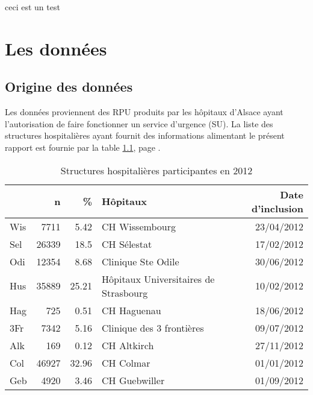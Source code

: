 \documentclass[12pt,english,french]{report}
\begin{document}








ceci est un test
%
%

\chapter{Les données}

\section{Origine des données}

Les données proviennent des RPU produits par les hôpitaux d'Alsace ayant l'autorisation de faire fonctionner un service d'urgence (SU). La liste des structures hospitalières ayant fournit des informations alimentant le présent rapport est fournie par la table \ref{tab1}, page \pageref{tab1}.

\begin{table}[ht]
\begin{center}
\begin{tabular}{|l|r|r|l|r|}
  \hline
 & n & \% & Hôpitaux & Date d'inclusion \\ 
  \hline
Wis & 7711 & 5.42 & CH Wissembourg & 23/04/2012 \\ 
  Sel & 26339 & 18.5 & CH Sélestat & 17/02/2012 \\ 
  Odi & 12354 & 8.68 & Clinique Ste Odile & 30/06/2012 \\ 
  Hus & 35889 & 25.21 & Hôpitaux Universitaires de Strasbourg & 10/02/2012 \\ 
  Hag & 725 & 0.51 & CH Haguenau & 18/06/2012 \\ 
  3Fr & 7342 & 5.16 & Clinique des 3 frontières & 09/07/2012 \\ 
  Alk & 169 & 0.12 & CH Altkirch & 27/11/2012 \\ 
  Col & 46927 & 32.96 & CH Colmar & 01/01/2012 \\ 
  Geb & 4920 & 3.46 & CH Guebwiller & 01/09/2012 \\ 
   \hline
\end{tabular}
\caption{Structures hospitalières participantes en 2012}
\label{tab1}
\end{center}
\end{table}
\end{document}
